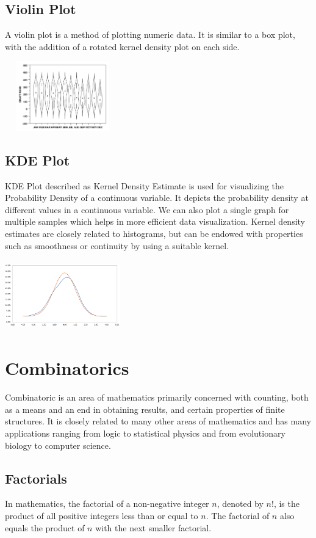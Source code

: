 \documentclass{article}
\begin{document}
\subsection{Violin Plot}
A violin plot is a method of plotting numeric data. It is similar to a box plot, with the addition of a rotated kernel density plot on each side.

\includegraphics[width=5cm, height=3cm]{violin_chart}

\subsection{KDE Plot}

KDE Plot described as Kernel Density Estimate is used for visualizing the Probability Density of a continuous variable. It depicts the probability density at different values in a continuous variable. We can also plot a single graph for multiple samples which helps in more efficient data visualization.
Kernel density estimates are closely related to histograms, but can be endowed with properties such as smoothness or continuity by using a suitable kernel.

\includegraphics[width=5cm, height=3cm]{kde_chart}
\clearpage

\section{Combinatorics}
Combinatoric is an area of mathematics primarily concerned with counting, both as a means and an end in obtaining results, and certain properties of finite structures. It is closely related to many other areas of mathematics and has many applications ranging from logic to statistical physics and from evolutionary biology to computer science.

\subsection{Factorials}
In mathematics, the factorial of a non-negative integer $n$, denoted by $n!$, is the product of all positive integers less than or equal to $n$. The factorial of $n$ also equals the product of $n$ with the next smaller factorial.
\end{document}
